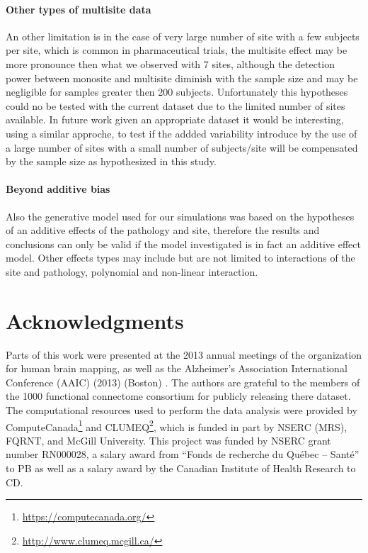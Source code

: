 \documentclass[authoryear]{elsarticle}
\begin{document}
\paragraph{Other types of multisite data} An other limitation is in the case of very large number of site with a few subjects per site, which is common in pharmaceutical trials, the multisite effect may be more pronounce then what we observed with 7 sites, although the detection power between monosite and multisite diminish with the sample size and may be negligible for samples greater then 200 subjects. Unfortunately this hypotheses could no be tested with the current dataset due to the limited number of sites available. In future work given an appropriate dataset it would be interesting, using a similar approche, to test if the addded variability introduce by the use of a large number of sites with a small number of subjects/site will be compensated by the sample size as hypothesized in this study.

\paragraph{Beyond additive bias} Also the generative model used for our simulations was based on the hypotheses of an additive effects of the pathology and site, therefore the results and conclusions can only be valid if the model investigated is in fact an additive effect model. Other effects types may include but are not limited to interactions of the site and pathology, polynomial and non-linear interaction.  

\section{Acknowledgments}
Parts of this work were presented at the 2013 annual meetings of the organization for human brain mapping, as well as the  Alzheimer's Association International Conference (AAIC) (2013) (Boston) \citep{Dansereau2013b}. The authors are grateful to the members of the 1000 functional connectome consortium for publicly releasing there dataset. The computational resources used to perform the data analysis were provided by ComputeCanada\footnote{\url{https://computecanada.org/}} and CLUMEQ\footnote{\url{http://www.clumeq.mcgill.ca/}}, which is funded in part by NSERC (MRS), FQRNT, and McGill University. This project was funded by NSERC grant number RN000028, a salary award from ``Fonds de recherche du Qu\'ebec -- Sant\'e'' to PB as well as a salary award by the Canadian Institute of Health Research to CD.
\end{document}
